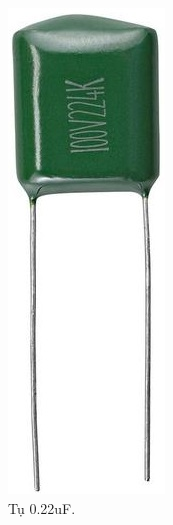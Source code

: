 \documentclass[a4paper,12pt,oneside]{article}
\begin{document}
\begin{enumerate}
\begin{itemize}
\begin{figure}[H]
\centering
\begin{center}
\includegraphics[scale=.4]{hinh/PPM/ppm_c22.jpg}
\end{center}
\caption{Tụ 0.22uF\cite{dientuachau}.}
\end{figure}


\end{itemize}
\end{enumerate}
\end{document}
